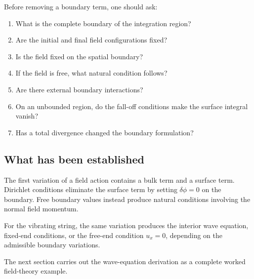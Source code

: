 Before removing a boundary term, one should ask:

\begin{enumerate}
    \item What is the complete boundary of the integration region?
    \item Are the initial and final field configurations fixed?
    \item Is the field fixed on the spatial boundary?
    \item If the field is free, what natural condition follows?
    \item Are there external boundary interactions?
    \item On an unbounded region, do the fall-off conditions make the surface integral vanish?
    \item Has a total divergence changed the boundary formulation?
\end{enumerate}

\subsection{What has been established}

The first variation of a field action contains a bulk term and a surface term. Dirichlet conditions eliminate the surface term by setting \(\delta\phi=0\) on the boundary. Free boundary values instead produce natural conditions involving the normal field momentum.

For the vibrating string, the same variation produces the interior wave equation, fixed-end conditions, or the free-end condition \(u_{x}=0\), depending on the admissible boundary variations.

The next section carries out the wave-equation derivation as a complete worked field-theory example.